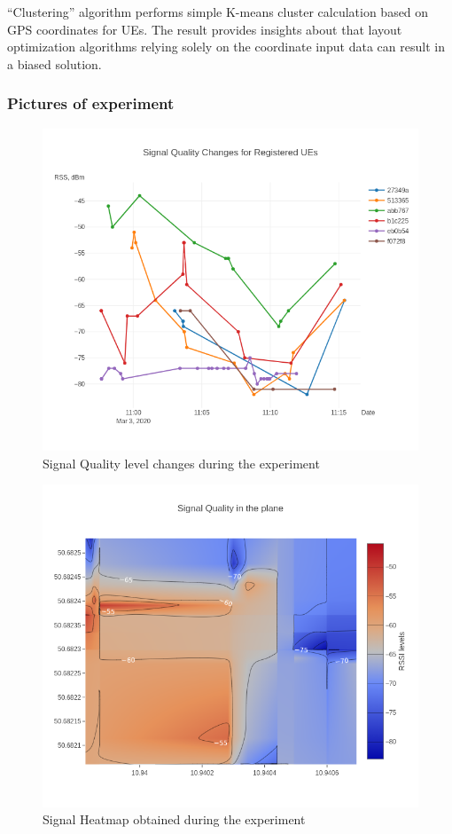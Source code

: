 ``Clustering'' algorithm performs simple K-means cluster calculation
based on GPS coordinates for UEs. The result provides insights about
that layout optimization algorithms relying solely on the coordinate
input data can result in a biased solution.

\hypertarget{pictures-of-experiment}{%
\subsubsection{Pictures of experiment}\label{pictures-of-experiment}}

\begin{figure}[H]
	\centering
	\includegraphics[width=\linewidth,keepaspectratio]{images/Exp4-Overall-Signal-Changes.png}
\caption{Signal Quality level changes during the experiment}
\end{figure}

\begin{figure}[H]
	\centering
	\includegraphics[width=\linewidth,keepaspectratio]{images/Exp4_Overall_Heatmap.png}
\caption{Signal Heatmap obtained during the experiment}
\end{figure}

